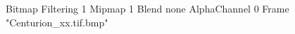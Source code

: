 {Bitmap
	{Filtering 1}
	{Mipmap 1}
	{Blend none}
	{AlphaChannel 0}
	{Frame "Centurion_xx.tif.bmp"}
}
